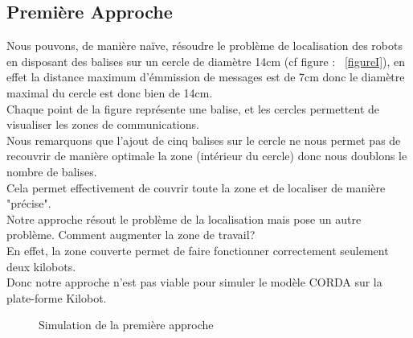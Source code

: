 \documentclass[a4paper,8pt]{report}
\begin{document}
\subsection*{Premi\`ere Approche}\label{sec:name}

Nous pouvons, de mani\`ere na\"{i}ve, r\'esoudre le probl\`eme de localisation des robots en disposant des balises sur un cercle de diam\`etre 14cm (cf figure : ~\ref{figureI}), en effet la distance maximum d'\'emmission de messages est de 7cm donc le diam\`etre maximal du cercle est donc bien de 14cm.\\
Chaque point de la figure repr\'esente une balise, et les cercles permettent de visualiser les zones de communications.\\
Nous remarquons que l'ajout de cinq balises sur le cercle ne nous permet pas de recouvrir de mani\`ere optimale la zone (int\'erieur du cercle) donc nous doublons le nombre de balises.\\
Cela permet effectivement de couvrir toute la zone et de localiser de mani\`ere "pr\'ecise".\\
Notre approche r\'esout le probl\`eme de la localisation mais pose un autre probl\`eme. Comment augmenter la zone de travail?\\
En effet, la zone couverte permet de faire fonctionner correctement seulement deux kilobots.\\
Donc notre approche n'est pas viable pour simuler le mod\`ele CORDA sur la plate-forme Kilobot.\\

\begin{figure}[!h]
    \centering
    \caption{Simulation de la première approche}
\end{figure}
\end{document}
